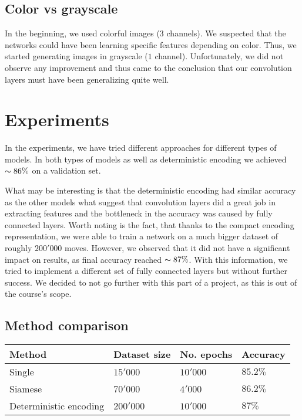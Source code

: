 \documentclass[10pt,twocolumn,letterpaper]{article}
\begin{document}
\subsection{Color vs grayscale}

In the beginning, we used colorful images ($3$ channels). We suspected that the
networks could have been learning specific features depending on color. Thus, we
started generating images in grayscale ($1$ channel). Unfortunately, we did not
observe any improvement and thus came to the conclusion that our convolution layers
must have been generalizing quite well.

\section{Experiments}

In the experiments, we have tried different approaches for different types of
models. In both types of models as well as deterministic encoding we achieved
$\thicksim 86\%$ on a validation set.

What may be interesting is that the deterministic encoding had similar accuracy as the other
models what suggest that convolution layers did a great job in extracting
features and the bottleneck in the accuracy was caused by fully connected
layers. Worth noting is the fact, that thanks to the compact encoding
representation, we were able to train a network on a much bigger dataset of
roughly $200'000$ moves. However, we observed that it did not have a significant
impact on results, as final accuracy reached $\thicksim 87\%$. With this
information, we tried to implement a different set of fully connected layers but
without further success. We decided to not go further with this part of a
project, as this is out of the course's scope.

\subsection{Method comparison}

\begin{center}
    \begin{tabular}{ | p{5em} | p{5em} | p{5em} | p{5em} |}
    \hline
    Method & Dataset size & No. epochs & Accuracy \\ [0.5ex] \hline \hline
    Single & $15'000$ & $10'000$ & $85.2\%$ \\
    \hline
    Siamese & $70'000$ & $4'000$ & $86.2\%$ \\ \hline
    Deterministic encoding & $200'000$ & $10'000$ & $87\%$ \\
    \hline
    \end{tabular}
\end{center}
\end{document}

